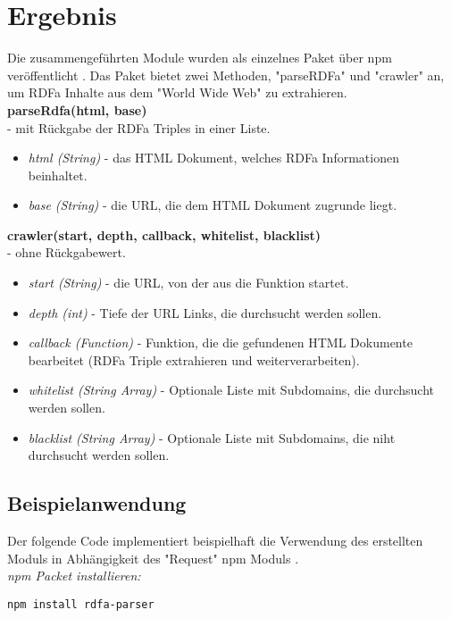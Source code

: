 \documentclass[hidelinks, a4paper, 11pt]{article} %
\begin{document}
\section{Ergebnis}

Die zusammengef\"uhrten Module wurden als einzelnes Paket \"uber npm ver\"offentlicht \cite{rdfaCrawler}. Das Paket bietet zwei Methoden, "parseRDFa" und "crawler" an, um RDFa Inhalte aus dem "World Wide Web" zu extrahieren. \\

\textbf{parseRdfa(html, base)} \\
- mit R\"uckgabe der RDFa Triples in einer Liste.
\begin{itemize}
\item \textit{html (String)} - das HTML Dokument, welches RDFa Informationen beinhaltet.
\item \textit{base (String)} - die URL, die dem HTML Dokument zugrunde liegt.
\end{itemize}

\textbf{crawler(start, depth, callback, whitelist, blacklist)} \\
- ohne R\"uckgabewert.
\begin{itemize}
\item \textit{start (String)} - die URL, von der aus die Funktion startet.
\item \textit{depth (int)} - Tiefe der URL Links, die durchsucht werden sollen.
\item \textit{callback (Function)} - Funktion, die die gefundenen HTML Dokumente bearbeitet (RDFa Triple extrahieren und weiterverarbeiten).
\item \textit{whitelist (String Array)} - Optionale Liste mit Subdomains, die durchsucht werden sollen.
\item \textit{blacklist (String Array)} - Optionale Liste mit Subdomains, die niht durchsucht werden sollen.
\end{itemize}

\subsection{Beispielanwendung}

Der folgende Code implementiert beispielhaft die Verwendung des erstellten Moduls in Abh\"angigkeit des "Request" npm Moduls \cite{requestModule}. \\

\textit{npm Packet installieren:}
\begin{lstlisting}
npm install rdfa-parser
\end{lstlisting}
\end{document}
